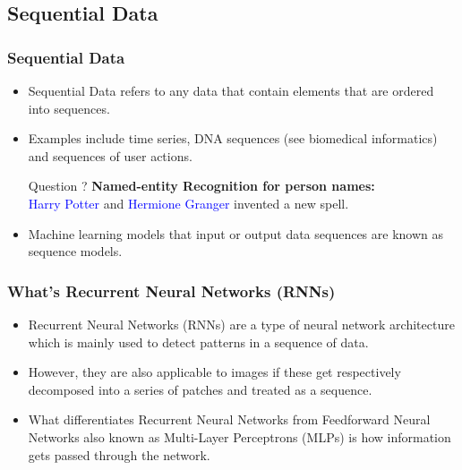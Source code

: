 \documentclass[
	11pt,
]{beamer}
\begin{document}
\subsection{Sequential Data}
\begin{frame}
	\frametitle{Sequential Data}
	\begin{itemize}
		\item Sequential Data refers to any data that contain elements that are ordered into sequences. 
	\bigskip
		\item Examples include time series, DNA sequences (see biomedical informatics) and sequences of user actions.
	\bigskip
	\begin{block}{Question ?}
		\fontsize{10}{12}\selectfont \textbf{Named-entity Recognition for person names:} \\
		\smallskip
		\;\;\;\;\;\;\;\;\;\;\;\;\;\;\;\;\;\;\;\textcolor{blue}{Harry Potter} and \textcolor{blue}{Hermione Granger} invented a new spell.
	\end{block}
	\bigskip
		\item Machine learning models that input or output data sequences are known as sequence models.
\end{itemize}
\end{frame}
\begin{frame}
	\frametitle{What's Recurrent Neural Networks (RNNs)}
	\begin{itemize}
		\item Recurrent Neural Networks (RNNs) are a type of neural network architecture which is mainly used to detect patterns
		in a sequence of data.
		\bigskip
		\item However, they are also applicable to images if these get
		respectively decomposed into a series of patches and treated as a sequence.
		\bigskip
		\item What differentiates Recurrent Neural Networks from Feedforward Neural Networks also known as Multi-Layer Perceptrons
		(MLPs) is how information gets passed through the network.
	\end{itemize}
\end{frame}
\end{document}
